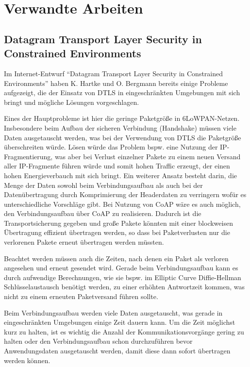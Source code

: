\documentclass[a4paper,10pt]{report}
\begin{document}

\section{Verwandte Arbeiten}

\subsection{Datagram Transport Layer Security in Constrained Environments}
Im Internet-Entwurf "`Datagram Transport Layer Security in Constrained Environments"' \cite{draftcodtls} haben K. Hartke und O. Bergmann
bereits einige Probleme aufgezeigt, die der Einsatz von DTLS in eingeschränkten Umgebungen mit sich bringt und mögliche Lösungen vorgeschlagen.

Eines der Hauptprobleme ist hier die geringe Paketgröße in 6LoWPAN-Netzen. Insbesondere beim Aufbau der sicheren Verbindung (Handshake) müssen
viele Daten ausgetauscht werden, was bei der Verwendung von DTLS die Paketgröße überschreiten würde. Lösen würde das Problem bspw. eine Nutzung der
IP-Fragmentierung, was aber bei Verlust einzelner Pakete zu einem neuen Versand aller IP-Fragmente führen würde und somit hohen Traffic erzeugt,
der einen hohen Energieverbauch mit sich bringt. Ein weiterer Ansatz besteht darin, die Menge der Daten sowohl beim Verbindungsaufbau als auch
bei der Datenübertragung durch Komprimierung der Headerdaten zu verringern wofür es unterschiedliche Vorschläge gibt. Bei Nutzung von CoAP wäre
es auch möglich, den Verbindungsaufbau über CoAP zu realisieren. Dadurch ist die Transportsicherung gegeben und große Pakete könnten mit einer
blockweisen Übertragung effizient übertragen werden, so dass bei Paketverlusten nur die verlorenen Pakete erneut übertragen werden müssten.

Beachtet werden müssen auch die Zeiten, nach denen ein Paket als verloren angesehen und erneut gesendet wird. Gerade beim Verbindungsaufbau
kann es durch aufwendige Berechnungen, wie sie bspw. im Elliptic Curve Diffie-Hellman Schlüsselaustausch benötigt werden, zu einer erhöhten
Antwortzeit kommen, was nicht zu einem erneuten Paketversand führen sollte.

Beim Verbindungsaufbau werden viele Daten ausgetauscht, was gerade in eingeschränkten Umgebungen einige Zeit dauern kann. Um die Zeit
möglichst kurz zu halten, ist es wichtig die Anzahl der Kommunikationsvorgänge gering zu halten oder den Verbindungsaufbau schon durchzuführen
bevor Anwendungsdaten ausgetauscht werden, damit diese dann sofort übertragen werden können.
\end{document}
